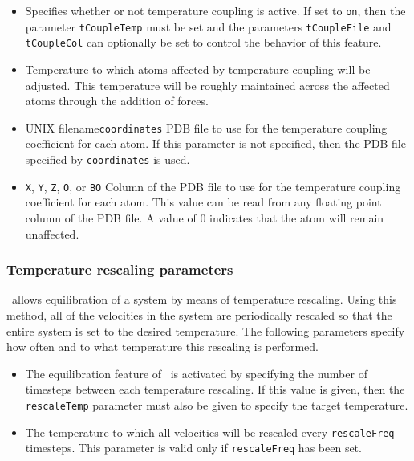 \begin{itemize}

\item
{}
{Specifies whether or not temperature coupling is active.  
If set to \verb!on!, then the parameter \verb!tCoupleTemp! must be set and 
the parameters \verb!tCoupleFile! and \verb!tCoupleCol! can 
optionally be set to control the behavior of this feature.} 

\item
{}
{Temperature to which atoms affected 
by temperature coupling will be adjusted.  
This temperature will be roughly maintained across the affected atoms 
through the addition of forces.}

\item
{}%
{UNIX filename}{\verb!coordinates!}%
{PDB file to use for the temperature coupling coefficient for each atom.  
If this parameter is not specified, then 
the PDB file specified by \verb!coordinates! is used.} 

\item
{}
{\verb!X!, \verb!Y!, \verb!Z!, \verb!O!, or \verb!B!}{\verb!O!} 
{Column of the PDB file to use for the temperature coupling coefficient for 
each atom.  This value can be read from any 
floating point column of the PDB file.  
A value of $0$ indicates that the atom will remain unaffected.}

\end{itemize}

\subsubsection{Temperature rescaling parameters}

\NAMD\ allows equilibration of a system by means of temperature 
rescaling.  Using this method, all of the velocities in the system 
are periodically rescaled so that the entire system is set to the 
desired temperature.  The following parameters specify how often 
and to what temperature this rescaling is performed.  

\begin{itemize}

\item
{}
{The equilibration feature of \NAMD\ is activated by 
specifying the number of timesteps between each temperature rescaling.  
If this value is given, then the \verb!rescaleTemp! parameter must also 
be given to specify the target temperature. }

\item
{}
{The temperature to which all velocities will be rescaled
every \verb!rescaleFreq! timesteps.  
This parameter is valid only if \verb!rescaleFreq! has been set.}

\end{itemize}

